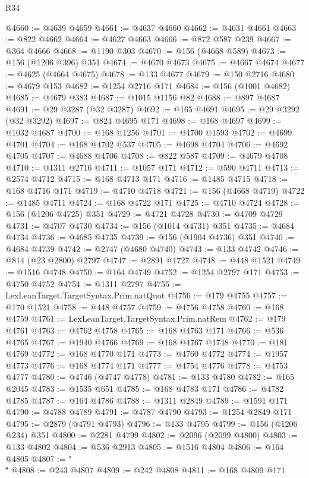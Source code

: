 \begin{lexlean}{R34}
\begin{coremodule}
@4660 := @4639 @4659
@4661 := @4637 @4660
@4662 := @4631 @4661
@4663 := @822 @4662
@4664 := @4627 @4663
@4666 := @872 @587 @239
@4667 := @364 @4666
@4668 := @1190 @303
@4670 := @156 (@4668 @589)
@4673 := @156 (@1206 @396) @351
@4674 := @4670 @4673
@4675 := @4667 @4674
@4677 := @4625 (@4664 @4675)
@4678 := @133 @4677
@4679 := @150 @2716
@4680 := @4679 @153
@4682 := @1254 @2716 @171
@4684 := @156 (@1001 @4682)
@4685 := @4679 @383
@4687 := @1015 @1156 @82
@4688 := @897 @4687
@4691 := @29 @3287 (@32 @3287)
@4692 := @165 @4691
@4695 := @29 @3292 (@32 @3292)
@4697 := @824 @4695 @171
@4698 := @168 @4697
@4699 := @1032 @4687
@4700 := @168 @1256
@4701 := @4700 @1593
@4702 := @4699 @4701
@4704 := @168 @4702 @537
@4705 := @4698 @4704
@4706 := @4692 @4705
@4707 := @4688 @4706
@4708 := @822 @587
@4709 := @4679 @4708
@4710 := @1311 @2716
@4711 := @1057 @171
@4712 := @590 @4711
@4713 := @2574 @4712
@4715 := @168 @4713 @171
@4716 := @1485 @4715
@4718 := @168 @4716 @171
@4719 := @4710 @4718
@4721 := @156 (@4668 @4719)
@4722 := @1485 @4711
@4724 := @168 @4722 @171
@4725 := @4710 @4724
@4728 := @156 (@1206 @4725) @351
@4729 := @4721 @4728
@4730 := @4709 @4729
@4731 := @4707 @4730
@4734 := @156 (@1014 @4731) @351
@4735 := @4684 @4734
@4736 := @4685 @4735
@4739 := @156 (@1904 @4736) @351
@4740 := @4684 @4739
@4742 := @2747 (@4680 @4740)
@4743 := @133 @4742
@4746 := @814 (@23 @2800) @2797
@4747 := @2891 @1727
@4748 := @448 @1521
@4749 := @1516 @4748
@4750 := @164 @4749
@4752 := @1254 @2797 @171
@4753 := @4750 @4752
@4754 := @1311 @2797
@4755 := LexLeanTarget.TargetSyntax.Prim.natQuot
@4756 := @179 @4755
@4757 := @170 @1521
@4758 := @448 @4757
@4759 := @4756 @4758
@4760 := @168 @4759
@4761 := LexLeanTarget.TargetSyntax.Prim.natRem
@4762 := @179 @4761
@4763 := @4762 @4758
@4765 := @168 @4763 @171
@4766 := @536 @4765
@4767 := @1940 @4766
@4769 := @168 @4767 @1748
@4770 := @181 @4769
@4772 := @168 @4770 @171
@4773 := @4760 @4772
@4774 := @1957 @4773
@4776 := @168 @4774 @171
@4777 := @4754 @4776
@4778 := @4753 @4777
@4780 := @4746 (@4747 @4778)
@4781 := @133 @4780
@4782 := @165 @2045
@4783 := @1535 @651
@4785 := @168 @4783 @171
@4786 := @4782 @4785
@4787 := @164 @4786
@4788 := @1311 @2849
@4789 := @1591 @171
@4790 := @4788 @4789
@4791 := @4787 @4790
@4793 := @1254 @2849 @171
@4795 := @2879 (@4791 @4793)
@4796 := @133 @4795
@4799 := @156 (@1206 @234) @351
@4800 := @2281 @4799
@4802 := @2096 (@2099 @4800)
@4803 := @133 @4802
@4804 := @536 @2913
@4805 := @1516 @4804
@4806 := @164 @4805
@4807 := "\\\""
@4808 := @243 @4807
@4809 := @242 @4808
@4811 := @168 @4809 @171

\end{coremodule}
\end{lexlean}

